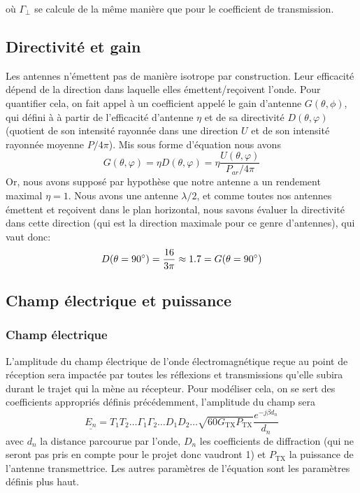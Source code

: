 o{\`u} $\Gamma_{\perp}$ se calcule de la m{\^e}me mani{\`e}re que pour le
coefficient de transmission.

\subsection{Directivit{\'e} et gain}

Les antennes n'{\'e}mettent pas de mani{\`e}re isotrope par construction. Leur
efficacit{\'e} d{\'e}pend de la direction dans laquelle elles
{\'e}mettent/re{\c c}oivent l'onde. Pour quantifier cela, on fait appel {\`a}
un coefficient appel{\'e} le gain d'antenne $G (\theta, \phi)$, qui défini à
{\`a} partir de l'efficacité d'antenne $\eta$ et de sa directivit{\'e} $D (\theta, \varphi)$ (quotient de son intensit{\'e} rayonn{\'e}e
dans une direction $U$ et de son intensit{\'e} rayonn{\'e}e moyenne $P / 4
\pi$). Mis sous forme d'{\'e}quation nous avons
\[ G (\theta, \varphi) = \eta D (\theta, \varphi) = \eta \frac{U (\theta,
   \varphi)}{P_{a r} / 4 \pi} \]
Or, nous avons suppos{\'e} par hypoth{\`e}se que notre antenne a un rendement
maximal $\eta = 1$. Nous avons une antenne $\lambda / 2$, et comme toutes nos
antennes {\'e}mettent et re{\c c}oivent dans le plan horizontal, nous savons
{\'e}valuer la directivit{\'e} dans cette direction (qui est la direction
maximale pour ce genre d'antennes), qui vaut donc:
\[ D (\theta = 90\degree) = \frac{16}{3 \pi} \approx 1.7 = G
   (\theta = 90\degree )\]
   
\subsection{Champ {\'e}lectrique et puissance }

\subsubsection*{Champ électrique}
L'amplitude du champ {\'e}lectrique de l'onde {\'e}lectromagn{\'e}tique re{\c
c}ue au point de r{\'e}ception sera impact{\'e}e par toutes les r{\'e}flexions
et transmissions qu'elle subira durant le trajet qui la m{\`e}ne au
r{\'e}cepteur. Pour mod{\'e}liser cela, on se sert des coefficients
appropri{\'e}s d{\'e}finis pr{\'e}c{\'e}demment, l'amplitude du champ sera
\begin{equation}
\label{eq:elec-field}
    \underline{E_n} = T_1 T_2 \ldots \Gamma_1 \Gamma_2 \ldots D_1 D_2 \ldots \sqrt{60 G_{\mathrm{TX}} P_{\mathrm{TX}}} \frac{e^{- j \beta d_n}}{d_n}
\end{equation}
avec $d_n$ la distance parcourue par l'onde, $D_n$ les coefficients de
diffraction (qui ne seront pas pris en compte pour le projet donc vaudront 1)
et $P_{\mathrm{TX}}$ la puissance de l'antenne transmettrice. Les autres param{\`e}tres de
l'{\'e}quation sont les param{\`e}tres d{\'e}finis plus haut.

